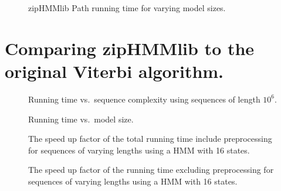\begin{figure}[H]
  \centering
  
  \caption{zipHMMlib Path running time for varying model sizes.}
  \label{fig:assymptotic_viterbi_path_k}
\end{figure}

%   

\section{Comparing zipHMMlib to the original Viterbi algorithm.}
\label{sec:comp-ziphmml-orig}

\begin{figure}[H]
  \centering
  
  \caption{Running time vs.\ sequence complexity using sequences of length $10^6$.}
  \label{fig:speedup_vs_complexity}
\end{figure}

\begin{figure}[H]
  \centering
  
  \caption{Running time vs.\ model size.}
  \label{fig:speedup_vs_k}
\end{figure}

\begin{figure}[H]
  \centering
  
  \caption{The speed up factor of the total running time include preprocessing
    for sequences of varying lengths using a HMM with 16 states.}
  \label{fig:speedup_vs_sequence_length}
\end{figure}

\begin{figure}[H]
  \centering
  
  \caption{The speed up factor of the running time excluding preprocessing for
    sequences of varying lengths using a HMM with 16 states.}
  \label{fig:speedup_vs_sequence_length2}
\end{figure}

